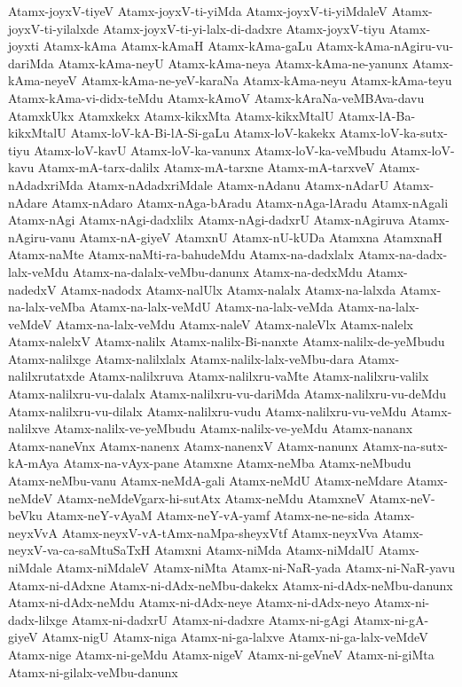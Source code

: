 {Atamx-joyxV-tiyeV
Atamx-joyxV-ti-yiMda
Atamx-joyxV-ti-yiMdaleV
Atamx-joyxV-ti-yilalxde
Atamx-joyxV-ti-yi-lalx-di-dadxre
Atamx-joyxV-tiyu
Atamx-joyxti
Atamx-kAma
Atamx-kAmaH
Atamx-kAma-gaLu
Atamx-kAma-nAgiru-vu-dariMda
Atamx-kAma-neyU
Atamx-kAma-neya
Atamx-kAma-ne-yanunx
Atamx-kAma-neyeV
Atamx-kAma-ne-yeV-karaNa
Atamx-kAma-neyu
Atamx-kAma-teyu
Atamx-kAma-vi-didx-teMdu
Atamx-kAmoV
Atamx-kAraNa-veMBAva-davu
AtamxkUkx
Atamxkekx
Atamx-kikxMta
Atamx-kikxMtalU
Atamx-lA-Ba-kikxMtalU
Atamx-loV-kA-Bi-lA-Si-gaLu
Atamx-loV-kakekx
Atamx-loV-ka-sutx-tiyu
Atamx-loV-kavU
Atamx-loV-ka-vanunx
Atamx-loV-ka-veMbudu
Atamx-loV-kavu
Atamx-mA-tarx-dalilx
Atamx-mA-tarxne
Atamx-mA-tarxveV
Atamx-nAdadxriMda
Atamx-nAdadxriMdale
Atamx-nAdanu
Atamx-nAdarU
Atamx-nAdare
Atamx-nAdaro
Atamx-nAga-bAradu
Atamx-nAga-lAradu
Atamx-nAgali
Atamx-nAgi
Atamx-nAgi-dadxlilx
Atamx-nAgi-dadxrU
Atamx-nAgiruva
Atamx-nAgiru-vanu
Atamx-nA-giyeV
AtamxnU
Atamx-nU-kUDa
Atamxna
AtamxnaH
Atamx-naMte
Atamx-naMti-ra-bahudeMdu
Atamx-na-dadxlalx
Atamx-na-dadx-lalx-veMdu
Atamx-na-dalalx-veMbu-danunx
Atamx-na-dedxMdu
Atamx-nadedxV
Atamx-nadodx
Atamx-nalUlx
Atamx-nalalx
Atamx-na-lalxda
Atamx-na-lalx-veMba
Atamx-na-lalx-veMdU
Atamx-na-lalx-veMda
Atamx-na-lalx-veMdeV
Atamx-na-lalx-veMdu
Atamx-naleV
Atamx-naleVlx
Atamx-nalelx
Atamx-nalelxV
Atamx-nalilx
Atamx-nalilx-Bi-nanxte
Atamx-nalilx-de-yeMbudu
Atamx-nalilxge
Atamx-nalilxlalx
Atamx-nalilx-lalx-veMbu-dara
Atamx-nalilxrutatxde
Atamx-nalilxruva
Atamx-nalilxru-vaMte
Atamx-nalilxru-valilx
Atamx-nalilxru-vu-dalalx
Atamx-nalilxru-vu-dariMda
Atamx-nalilxru-vu-deMdu
Atamx-nalilxru-vu-dilalx
Atamx-nalilxru-vudu
Atamx-nalilxru-vu-veMdu
Atamx-nalilxve
Atamx-nalilx-ve-yeMbudu
Atamx-nalilx-ve-yeMdu
Atamx-nananx
Atamx-naneVnx
Atamx-nanenx
Atamx-nanenxV
Atamx-nanunx
Atamx-na-sutx-kA-mAya
Atamx-na-vAyx-pane
Atamxne
Atamx-neMba
Atamx-neMbudu
Atamx-neMbu-vanu
Atamx-neMdA-gali
Atamx-neMdU
Atamx-neMdare
Atamx-neMdeV
Atamx-neMdeVgarx-hi-sutAtx
Atamx-neMdu
AtamxneV
Atamx-neV-beVku
Atamx-neY-vAyaM
Atamx-neY-vA-yamf
Atamx-ne-ne-sida
Atamx-neyxVvA
Atamx-neyxV-vA-tAmx-naMpa-sheyxVtf
Atamx-neyxVva
Atamx-neyxV-va-ca-saMtuSaTxH
Atamxni
Atamx-niMda
Atamx-niMdalU
Atamx-niMdale
Atamx-niMdaleV
Atamx-niMta
Atamx-ni-NaR-yada
Atamx-ni-NaR-yavu
Atamx-ni-dAdxne
Atamx-ni-dAdx-neMbu-dakekx
Atamx-ni-dAdx-neMbu-danunx
Atamx-ni-dAdx-neMdu
Atamx-ni-dAdx-neye
Atamx-ni-dAdx-neyo
Atamx-ni-dadx-lilxge
Atamx-ni-dadxrU
Atamx-ni-dadxre
Atamx-ni-gAgi
Atamx-ni-gA-giyeV
Atamx-nigU
Atamx-niga
Atamx-ni-ga-lalxve
Atamx-ni-ga-lalx-veMdeV
Atamx-nige
Atamx-ni-geMdu
Atamx-nigeV
Atamx-ni-geVneV
Atamx-ni-giMta
Atamx-ni-gilalx-veMbu-danunx
}
